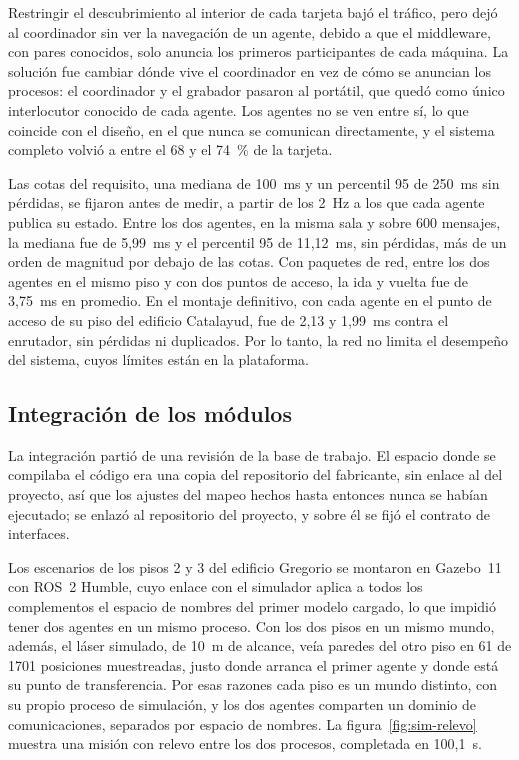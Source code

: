 Restringir el descubrimiento al interior de cada tarjeta bajó el tráfico, pero dejó al coordinador sin ver la navegación de un agente, debido a que el middleware, con pares conocidos, solo anuncia los primeros participantes de cada máquina. La solución fue cambiar dónde vive el coordinador en vez de cómo se anuncian los procesos: el coordinador y el grabador pasaron al portátil, que quedó como único interlocutor conocido de cada agente. Los agentes no se ven entre sí, lo que coincide con el diseño, en el que nunca se comunican directamente, y el sistema completo volvió a entre el 68 y el 74~\% de la tarjeta.

Las cotas del requisito, una mediana de 100~ms y un percentil 95 de 250~ms sin pérdidas, se fijaron antes de medir, a partir de los 2~Hz a los que cada agente publica su estado. Entre los dos agentes, en la misma sala y sobre 600 mensajes, la mediana fue de 5,99~ms y el percentil 95 de 11,12~ms, sin pérdidas, más de un orden de magnitud por debajo de las cotas. Con paquetes de red, entre los dos agentes en el mismo piso y con dos puntos de acceso, la ida y vuelta fue de 3,75~ms en promedio. En el montaje definitivo, con cada agente en el punto de acceso de su piso del edificio Catalayud, fue de 2,13 y 1,99~ms contra el enrutador, sin pérdidas ni duplicados. Por lo tanto, la red no limita el desempeño del sistema, cuyos límites están en la plataforma.

\subsection{Integración de los módulos}
\label{sec:integracion}
\label{sec:simulacion}
\label{sec:sim-a-vehiculos}

La integración partió de una revisión de la base de trabajo. El espacio donde se compilaba el código era una copia del repositorio del fabricante, sin enlace al del proyecto, así que los ajustes del mapeo hechos hasta entonces nunca se habían ejecutado; se enlazó al repositorio del proyecto, y sobre él se fijó el contrato de interfaces.

Los escenarios de los pisos 2 y 3 del edificio Gregorio se montaron en Gazebo~11 con ROS~2 Humble, cuyo enlace con el simulador aplica a todos los complementos el espacio de nombres del primer modelo cargado, lo que impidió tener dos agentes en un mismo proceso. Con los dos pisos en un mismo mundo, además, el láser simulado, de 10~m de alcance, veía paredes del otro piso en 61 de 1701 posiciones muestreadas, justo donde arranca el primer agente y donde está su punto de transferencia. Por esas razones cada piso es un mundo distinto, con su propio proceso de simulación, y los dos agentes comparten un dominio de comunicaciones, separados por espacio de nombres. La figura~\ref{fig:sim-relevo} muestra una misión con relevo entre los dos procesos, completada en 100,1~s.

